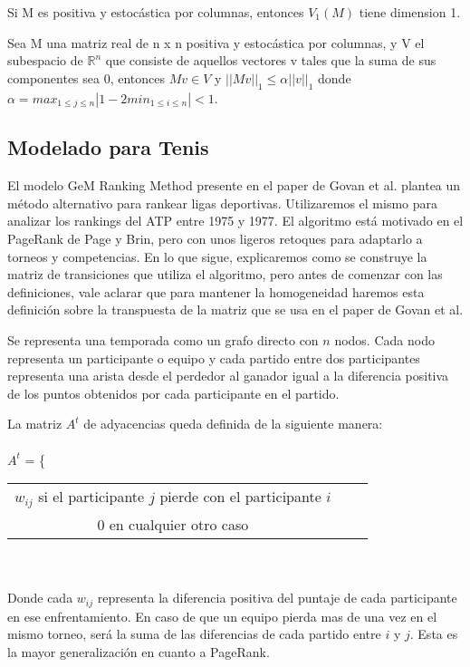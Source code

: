 \begin{lemma}
\item Si M es positiva y estocástica por columnas, entonces $V_1(M)$ tiene dimension 1.
\end{lemma}

\begin{proposition}
Sea M una matriz real de n x n positiva y estocástica por columnas, y V el subespacio de $\mathbb{R}^n$ que consiste de aquellos vectores v tales que la suma de sus componentes sea 0, entonces $Mv \in V$ y $||Mv||_1 \leq \alpha||v||_1$ donde $\alpha = max_{1 \leq j \leq n}|1 - 2min_{1 \leq i \leq n}| < 1$.
\end{proposition}

\subsection{Modelado para Tenis}

El modelo GeM Ranking Method presente en el paper de Govan et al. plantea un método alternativo para rankear ligas deportivas. Utilizaremos el mismo para analizar los rankings del ATP entre 1975 y 1977. El algoritmo está motivado en el PageRank de Page y Brin, pero con unos ligeros retoques para adaptarlo a torneos y competencias.
En lo que sigue, explicaremos como se construye la matriz de transiciones que utiliza el algoritmo, pero antes de comenzar con las definiciones, vale aclarar que para mantener la homogeneidad haremos esta definición sobre la transpuesta de la matriz que se usa en el paper de Govan et al.

Se representa una temporada como un grafo directo con $n$ nodos. Cada nodo representa un participante o equipo y cada partido entre dos participantes representa una arista desde el perdedor al ganador igual a la diferencia positiva de los puntos obtenidos por cada participante en el partido.

La matriz $A^t$ de adyacencias queda definida de la siguiente manera: 
\\\\
$A^t$ = \Bigg\{
  \begin{tabular}{ccc}
  $w_{ij}$ si el participante $j$ pierde con el participante $i$ \\
  0 en cualquier otro caso 
  \end{tabular}
\\\\
Donde cada $w_{ij}$ representa la diferencia positiva del puntaje de cada participante en ese enfrentamiento. En caso de que un equipo pierda mas de una vez en el mismo torneo, será la suma de las diferencias de cada partido entre $i$ y $j$. Esta es la mayor generalización en cuanto a PageRank.

